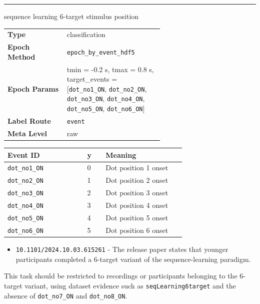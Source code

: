 {\begin{tcolorbox}
\noindent\rule{\linewidth}{0.7pt}\par\nopagebreak
{} {\footnotesize sequence learning 6-target stimulus position}\par\smallskip
{\footnotesize\begin{tabular}{@{}lp{0.62\linewidth}@{}}
\textbf{Type} & classification \\
\textbf{Epoch Method} & \texttt{epoch\_by\_event\_hdf5} \\
\textbf{Epoch Params} & tmin = -0.2 s, tmax = 0.8 s, target\_events = [\texttt{dot\_no1\_ON}, \texttt{dot\_no2\_ON}, \texttt{dot\_no3\_ON}, \texttt{dot\_no4\_ON}, \texttt{dot\_no5\_ON}, \texttt{dot\_no6\_ON}] \\
\textbf{Label Route} & \texttt{event} \\
\textbf{Meta Level} & raw \\
\end{tabular}}
\par{}\par\smallskip
\begingroup\footnotesize
\begin{tabular}{@{}p{0.3911\linewidth}p{0.0978\linewidth}p{0.3911\linewidth}@{}}
\toprule
\textbf{Event ID} & \textbf{y} & \textbf{Meaning} \\
\midrule
\texttt{dot\_no1\_ON} & 0 & Dot position 1 onset \\
\texttt{dot\_no2\_ON} & 1 & Dot position 2 onset \\
\texttt{dot\_no3\_ON} & 2 & Dot position 3 onset \\
\texttt{dot\_no4\_ON} & 3 & Dot position 4 onset \\
\texttt{dot\_no5\_ON} & 4 & Dot position 5 onset \\
\texttt{dot\_no6\_ON} & 5 & Dot position 6 onset \\
\bottomrule
\end{tabular}
\endgroup
\par{}\par
\begin{itemize}[leftmargin=1.3em,noitemsep,topsep=1pt]
\item[\scriptsize$\cdot$] {\scriptsize \texttt{10.1101/2024.10.03.615261} - The release paper states that younger participants completed a 6-target variant of the sequence-learning paradigm.}
\end{itemize}
\par{} {\footnotesize This task should be restricted to recordings or participants belonging to the 6-target variant, using dataset evidence such as \texttt{seqLearning6target} and the absence of \texttt{dot\_no7\_ON} and \texttt{dot\_no8\_ON}.}

\end{tcolorbox}}
